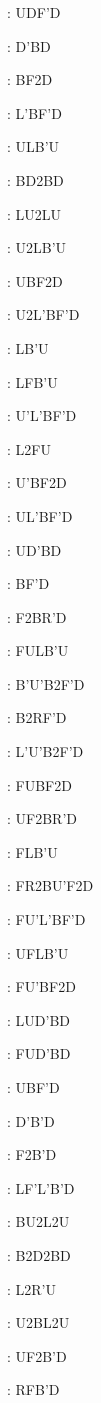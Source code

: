 \documentclass[9pt]{article}
\begin{document}
{\begin{multicols}{6}
: UDF'D

: D'BD

: BF2D

: L'BF'D

: ULB'U

: BD2BD

: LU2LU

: U2LB'U

: UBF2D

: U2L'BF'D

: LB'U

: LFB'U

: U'L'BF'D

: L2FU

: U'BF2D

: UL'BF'D

: UD'BD

: BF'D

: F2BR'D

: FULB'U

: B'U'B2F'D

: B2RF'D

: L'U'B2F'D

: FUBF2D

: UF2BR'D

: FLB'U

: FR2BU'F2D

: FU'L'BF'D

: UFLB'U

: FU'BF2D

: LUD'BD

: FUD'BD

: UBF'D

: D'B'D

: F2B'D

: LF'L'B'D

: BU2L2U

: B2D2BD

: L2R'U

: U2BL2U

: UF2B'D

: RFB'D


\end{multicols}}
\end{document}
